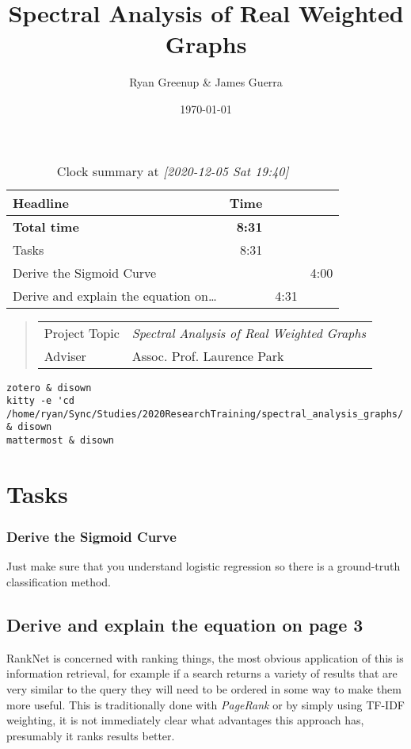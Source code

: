 \documentclass[a4paper,11pt,twoside]{article}
\author{Ryan Greenup \& James Guerra}
\date{\today}
\title{Spectral Analysis of Real Weighted Graphs}
\begin{document}
\maketitle
\tableofcontents

 \newpage 

\begin{table}[htbp]
\centering
\begin{tabular}{lrll}
Headline & Time &  & \\
\hline
\textbf{Total time} & \textbf{8:31} &  & \\
\hline
Tasks & 8:31 &  & \\
\hspace*{2.0em}Derive the Sigmoid Curve &  &  & 4:00\\
\hspace*{1.0em}Derive and explain the equation on\ldots{} &  & 4:31 & \\
\end{tabular}
\caption{Clock summary at \textit{[2020-12-05 Sat 19:40]}}

\end{table}


\begin{quote}
\begin{center}
\begin{tabular}{ll}
Project Topic & \emph{Spectral Analysis of Real Weighted Graphs}\\
Adviser & Assoc. Prof. Laurence Park\\
\end{tabular}

\end{center}
\end{quote}

\begin{verbatim}
zotero & disown
kitty -e 'cd /home/ryan/Sync/Studies/2020ResearchTraining/spectral_analysis_graphs/' & disown
mattermost & disown
\end{verbatim}

\section{Tasks}
\label{sec:org99bde2d}
\subsubsection{Derive the Sigmoid Curve}
\label{sec:org7000edb}
Just make sure that you understand logistic regression so there is a ground-truth classification method.
\subsection{Derive and explain the equation on page 3}
\label{sec:orgaea1030}
RankNet is concerned with ranking things, the most obvious application of this
is information retrieval, for example if a search returns a variety of results
that are very similar to the query they will need to be ordered in some way to
make them more useful. This is traditionally done with \emph{PageRank} or by simply
using TF-IDF weighting, it is not immediately clear what advantages this
approach has, presumably it ranks results better.
\end{document}
